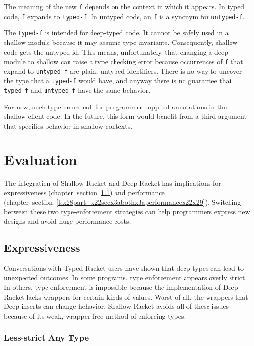 \documentclass[ twoside,open=right,titlepage,numbers=noenddot,headinclude,%
                footinclude=true,cleardoublepage=empty,abstract=off,
                BCOR=5mm,paper=a4,fontsize=11pt,%
                ngerman,american,%
                parts,pdfspacing]{scrreprt}
\newcommand{\SecRef}[2]{section~#1}
\newcommand{\SecRefLocal}[3]{\hyperref[#1]{\SecRef{#2}{#3}}}
\newcommand{\Scribtexttt}[1]{{\texttt{#1}}}
\let\SOriginalthesubsubsection\thesubsubsection
\newcommand{\Ssubsection}[2]{\subsection[#1]{#2}\let\thesubsubsection\SOriginalthesubsubsection}
\newcommand{\Ssubsubsection}[2]{\subsubsection[#1]{#2}}
\newcommand{\Ssubsubsubsectionstar}[1]{{\bf #1}}
\newcommand{\Ssubsubsubsectionstarx}[2]{\Ssubsubsubsectionstar{#2}}
\renewcommand{\Ssubsection}[2]{\section[#1]{#2}}
\renewcommand{\Ssubsubsection}[2]{\subsection[#1]{#2}}
\renewcommand{\Ssubsubsubsectionstar}[1]{\subsubsection*{#1}}
\renewcommand{\Ssubsubsubsectionstarx}[2]{\Ssubsubsubsectionstar{#2}\addcontentsline{toc}{subsubsection}{#1}}
\renewcommand{\SecRefLocal}[3]{section~\ref{#1}}
\begin{document}
\noindent{}The meaning of the new \Scribtexttt{f} depends on the context in which it appears.
In typed code, \Scribtexttt{f} expands to \Scribtexttt{typed{-}f}.
In untyped code, an \Scribtexttt{f} is a synonym for \Scribtexttt{untyped{-}f}.

The \Scribtexttt{typed{-}f} is intended for deep{-}typed code.
It cannot be safely used in a shallow module because it may
 assume type invariants.
Consequently, shallow code gets the untyped id.
This means, unfortunately, that changing a deep module to shallow
 can raise a type checking error because occurrences of \Scribtexttt{f} that expand to
 \Scribtexttt{untyped{-}f} are plain, untyped identifiers.
There is no way to uncover the type that a \Scribtexttt{typed{-}f} would have, and
 anyway there is no guarantee that \Scribtexttt{typed{-}f} and \Scribtexttt{untyped{-}f} have
 the same behavior.

For now, such type errors call for programmer{-}supplied annotations in
 the shallow client code.
In the future, this  form would benefit
 from a third argument that specifies behavior in shallow contexts.

\Ssubsection{Evaluation}{Evaluation}\label{t:x28part_x22secx3abothx3aevaluationx22x29}

The integration of Shallow Racket and Deep Racket has implications for
 expressiveness (chapter~\SecRefLocal{t:x28part_x22secx3abothx3aexpressivenessx22x29}{6.3.1}{Expressiveness}) and performance (chapter~\SecRefLocal{t:x28part_x22secx3abothx3aperformancex22x29}{6.3.2}{Performance}).
Switching between these two type{-}enforcement strategies can help programmers
 express new designs and avoid huge performance costs.

\Ssubsubsection{Expressiveness}{Expressiveness}\label{t:x28part_x22secx3abothx3aexpressivenessx22x29}

Conversations with Typed Racket users have shown that deep types can
 lead to unexpected outcomes.
In some programs, type enforcement appears overly strict.
In others, type enforcement is impossible because the implementation of
 Deep Racket lacks wrappers for certain kinds of values.
Worst of all, the wrappers that Deep inserts can change hehavior.
Shallow Racket avoids all of these issues because of its weak, wrapper{-}free
 method of enforcing types.

\Ssubsubsubsectionstarx{Less{-}strict Any Type}{Less{-}strict Any Type}\label{t:x28part_x22Lessx2dstrictx5fAnyx5fTypex22x29}
\end{document}
